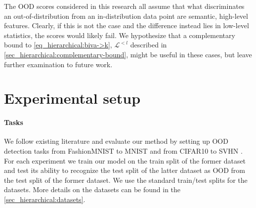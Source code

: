 {The OOD scores considered in this research all assume that what discriminates an out-of-distribution from an in-distribution data point are semantic, high-level features. Clearly, if this is not the case and the difference instead lies in low-level statistics, the scores would likely fail. We hypothesize that a complementary bound to \cref{eq_hierarchical:biva->k}, $\mathcal{L}^{<l}$ described in \cref{sec_hierarchical:complementary-bound}, might be useful in these cases, but leave further examination to future work.


\section{Experimental setup}

\paragraph{Tasks} We follow existing literature \parencite{nalisnick_deep_2019, hendrycks_deep_2019} and evaluate our method by setting up OOD detection tasks from FashionMNIST \parencite{xiao_fashionmnist_2017} to MNIST \parencite{lecun_gradientbased_1998} and from CIFAR10 \parencite{krizhevsky_learning_2009} to SVHN \parencite{netzer_reading_2011}.
For each experiment we train our model on the train split of the former dataset and test its ability to recognize the test split of the latter dataset as OOD from the test split of the former dataset.
We use the standard train/test splits for the datasets.
More details on the datasets can be found in the \cref{sec_hierarchical:datasets}.


\begin{figure}[t]
    \centering
\end{figure}}
